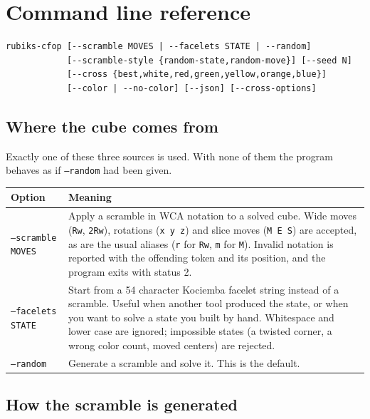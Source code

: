 \section{Command line reference}
\label{sec:cli}

\begin{lstlisting}[style=shell]
rubiks-cfop [--scramble MOVES | --facelets STATE | --random]
            [--scramble-style {random-state,random-move}] [--seed N]
            [--cross {best,white,red,green,yellow,orange,blue}]
            [--color | --no-color] [--json] [--cross-options]
\end{lstlisting}

\subsection{Where the cube comes from}

Exactly one of these three sources is used.  With none of them the program behaves
as if \texttt{--random} had been given.

\begin{longtable}{@{}p{3.2cm}p{11.2cm}@{}}
\toprule
Option & Meaning \\
\midrule
\endhead
\texttt{--scramble MOVES} &
Apply a scramble in WCA notation to a solved cube.  Wide moves
(\texttt{Rw}, \texttt{2Rw}), rotations (\texttt{x y z}) and slice moves
(\texttt{M E S}) are accepted, as are the usual aliases (\texttt{r} for
\texttt{Rw}, \texttt{m} for \texttt{M}).  Invalid notation is reported with the
offending token and its position, and the program exits with status 2. \\
\texttt{--facelets STATE} &
Start from a 54 character Kociemba facelet string instead of a scramble.  Useful
when another tool produced the state, or when you want to solve a state you built
by hand.  Whitespace and lower case are ignored; impossible states (a twisted
corner, a wrong color count, moved centers) are rejected. \\
\texttt{--random} &
Generate a scramble and solve it.  This is the default. \\
\bottomrule
\end{longtable}

\subsection{How the scramble is generated}

